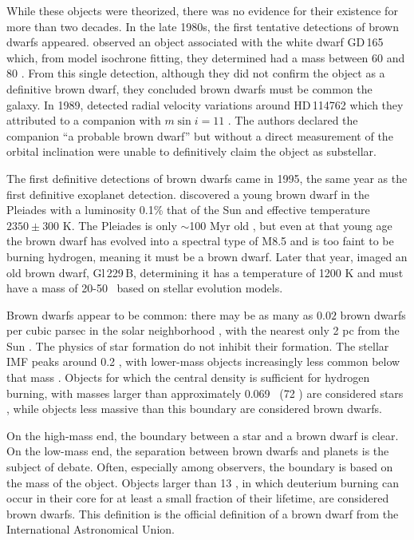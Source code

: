 While these objects were theorized, there was no evidence for their existence for more than two decades.
In the late 1980s, the first tentative detections of brown dwarfs appeared.
\citet{Becklin88} observed an object associated with the white dwarf GD\,165 which, from model isochrone
fitting, they determined had a mass between 60 and 80 \mjup.
From this single detection, although they did not confirm the object as a definitive brown dwarf,
they concluded brown dwarfs must be common the galaxy.
In 1989, \citet{Latham89} detected radial velocity variations around HD\,114762 which they attributed to
a companion with $m \sin i = 11$ \mjup. 
The authors declared the companion ``a probable brown dwarf'' but without a direct measurement of the
orbital inclination were unable to definitively claim the object as substellar.

The first definitive detections of brown dwarfs came in 1995, the same year as the first definitive exoplanet
detection.
\citet{Rebolo95} discovered a young brown dwarf in the Pleiades with a luminosity 0.1\% that of the Sun
and effective temperature $2350 \pm 300$ K.
The Pleiades is only $\sim$100 Myr old \citep{Basri96}, but even at that young age the brown dwarf has
evolved into a spectral type of M8.5 and is too faint to be burning hydrogen, meaning it must be
a brown dwarf.
Later that year, \citet{Nakajima95} imaged an old brown dwarf, Gl\,229\,B, determining it has a temperature
of 1200 K and must have a mass of 20-50 \mjup\ based on stellar evolution models.


Brown dwarfs appear to be common: there may be as many as $0.02$ brown dwarfs per
cubic parsec in the solar neighborhood \citep{Reyle10},
with the nearest only 2 pc from the Sun \citep{Luhman14}.
The physics of star formation do not inhibit their formation.
The stellar IMF peaks around 0.2 \msun, with lower-mass objects increasingly less common
below that mass \citep{Chabrier03}.
Objects for which the central density is sufficient for hydrogen burning, with masses larger than approximately 
0.069 \msun\ (72 \mjup) are considered stars \citep{Zuckerman00}, while objects less massive than this
boundary are considered brown dwarfs.


On the high-mass end, the boundary between a star and a brown dwarf is clear.
On the low-mass end, the separation between brown dwarfs and planets is 
the subject of debate.
Often, especially among observers, the boundary is based on the mass of the object.
Objects larger than 13 \mjup, in which deuterium burning can occur in their core for
at least a small fraction of their lifetime, are considered brown dwarfs.
This definition is the official definition of a brown dwarf from the International
Astronomical Union.

